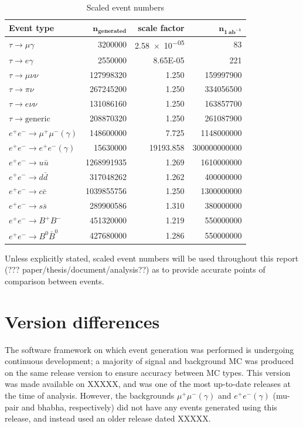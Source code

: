 \documentclass[12pt]{thesis}  %
\begin{document}
\begin{table}[h]
\centering
\begin{tabular}{lrrr}
\textbf{Event type} & $\mathbf{n_{\text{generated}}}$ & \textbf{scale factor} & $\mathbf{n_{\SI{1}{ab^{-1}}}}$ \\ \hline
\rowcolor[HTML]{EFEFEF} 
$\tau \to \mu\gamma$ & \num{3200000} & \num{2.58e-05} & \num{83} \\
\rowcolor[HTML]{EFEFEF}
$\tau \to e\gamma$ & \num{2550000} & \num{8.65E-05} & \num{221} \\       
$\tau \to \mu\nu\nu$ & \num{127998320} & \num{1.250} & \num{159997900} \\
$\tau \to \pi\nu$ & \num{267245200} & \num{1.250} & \num{334056500}  \\
$\tau \to e\nu\nu$ & \num{131086160} & \num{1.250} & \num{163857700}  \\
$\tau \to \text{generic}$ & \num{208870320} & \num{1.250} & \num{261087900} \\
$e^+e^- \to \mu^+\mu^-(\gamma)$ & \num{148600000} & \num{7.725} & \num{1148000000}  \\
$e^+e^- \to e^+e^-(\gamma)$ & \num{15630000} & \num{19193.858} & \num{300000000000}  \\
$e^+e^- \to u\bar{u}$ & \num{1268991935} & \num{1.269} & \num{1610000000} \\
$e^+e^- \to d\bar{d}$ & \num{317048262} & \num{1.262} & \num{400000000} \\
$e^+e^- \to c\bar{c}$ & \num{1039855756} & \num{1.250}  & \num{1300000000} \\
$e^+e^- \to s\bar{s}$ & \num{289900586} & \num{1.310}  & \num{380000000}  \\
$e^+e^- \to B^+B^-$ & \num{451320000} & \num{1.219}  & \num{550000000}  \\
$e^+e^- \to B^0\bar{B}^0$ & \num{427680000} & \num{1.286}  & \num{550000000} 
\end{tabular}
\caption{Scaled event numbers}
\label{my-label}
\end{table}

Unless explicitly stated, scaled event numbers will be used throughout this report (??? paper/thesis/document/analysis??) as to provide accurate points of comparison between events.


\section{Version differences}

The software framework on which event generation was performed is undergoing continuous development; a majority of signal and background MC was produced on the same release version to ensure accuracy between MC types. This version was made available on XXXXX, and was one of the most up-to-date releases at the time of analysis. However, the backgrounds $\mu^+\mu^-(\gamma)$ and $e^+ e^-(\gamma)$ (mu-pair and bhabha, respectively) did not have any events generated using this release, and instead used an older release dated XXXXX.
\end{document}
